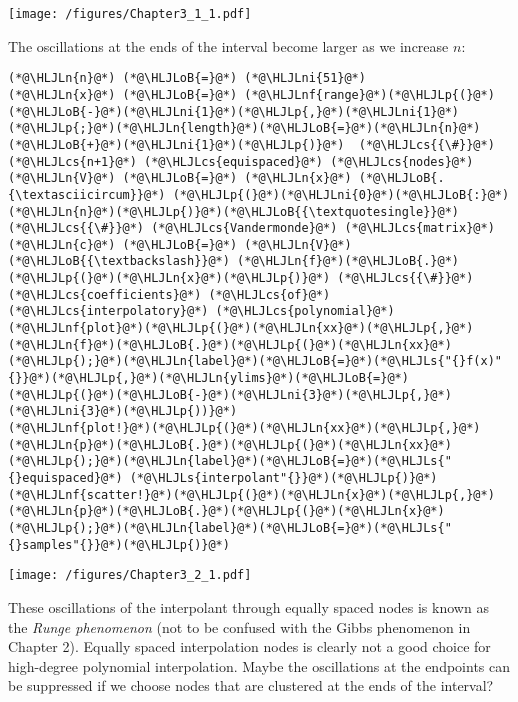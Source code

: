 \documentclass[12pt,a4paper]{article}
\newcommand{\HLJLn}[1]{#1}
\newcommand{\HLJLnf}[1]{\textcolor[RGB]{66,102,213}{#1}}
\newcommand{\HLJLs}[1]{\textcolor[RGB]{201,61,57}{#1}}
\newcommand{\HLJLni}[1]{\textcolor[RGB]{59,151,46}{#1}}
\newcommand{\HLJLoB}[1]{\textcolor[RGB]{102,102,102}{\textbf{#1}}}
\newcommand{\HLJLp}[1]{#1}
\newcommand{\HLJLcs}[1]{\textcolor[RGB]{153,153,119}{\textit{#1}}}
\begin{document}
\texttt{[image: /figures/Chapter3\_1\_1.pdf]}

The oscillations at the ends of the interval become larger as we increase $n$:


\begin{lstlisting}
(*@\HLJLn{n}@*) (*@\HLJLoB{=}@*) (*@\HLJLni{51}@*)
(*@\HLJLn{x}@*) (*@\HLJLoB{=}@*) (*@\HLJLnf{range}@*)(*@\HLJLp{(}@*)(*@\HLJLoB{-}@*)(*@\HLJLni{1}@*)(*@\HLJLp{,}@*)(*@\HLJLni{1}@*)(*@\HLJLp{;}@*)(*@\HLJLn{length}@*)(*@\HLJLoB{=}@*)(*@\HLJLn{n}@*)(*@\HLJLoB{+}@*)(*@\HLJLni{1}@*)(*@\HLJLp{)}@*)  (*@\HLJLcs{{\#}}@*) (*@\HLJLcs{n+1}@*) (*@\HLJLcs{equispaced}@*) (*@\HLJLcs{nodes}@*)  
(*@\HLJLn{V}@*) (*@\HLJLoB{=}@*) (*@\HLJLn{x}@*) (*@\HLJLoB{.{\textasciicircum}}@*) (*@\HLJLp{(}@*)(*@\HLJLni{0}@*)(*@\HLJLoB{:}@*)(*@\HLJLn{n}@*)(*@\HLJLp{)}@*)(*@\HLJLoB{{\textquotesingle}}@*) (*@\HLJLcs{{\#}}@*) (*@\HLJLcs{Vandermonde}@*) (*@\HLJLcs{matrix}@*)
(*@\HLJLn{c}@*) (*@\HLJLoB{=}@*) (*@\HLJLn{V}@*) (*@\HLJLoB{{\textbackslash}}@*) (*@\HLJLn{f}@*)(*@\HLJLoB{.}@*)(*@\HLJLp{(}@*)(*@\HLJLn{x}@*)(*@\HLJLp{)}@*) (*@\HLJLcs{{\#}}@*) (*@\HLJLcs{coefficients}@*) (*@\HLJLcs{of}@*) (*@\HLJLcs{interpolatory}@*) (*@\HLJLcs{polynomial}@*)
(*@\HLJLnf{plot}@*)(*@\HLJLp{(}@*)(*@\HLJLn{xx}@*)(*@\HLJLp{,}@*)(*@\HLJLn{f}@*)(*@\HLJLoB{.}@*)(*@\HLJLp{(}@*)(*@\HLJLn{xx}@*)(*@\HLJLp{);}@*)(*@\HLJLn{label}@*)(*@\HLJLoB{=}@*)(*@\HLJLs{"{}f(x)"{}}@*)(*@\HLJLp{,}@*)(*@\HLJLn{ylims}@*)(*@\HLJLoB{=}@*)(*@\HLJLp{(}@*)(*@\HLJLoB{-}@*)(*@\HLJLni{3}@*)(*@\HLJLp{,}@*)(*@\HLJLni{3}@*)(*@\HLJLp{))}@*)
(*@\HLJLnf{plot!}@*)(*@\HLJLp{(}@*)(*@\HLJLn{xx}@*)(*@\HLJLp{,}@*)(*@\HLJLn{p}@*)(*@\HLJLoB{.}@*)(*@\HLJLp{(}@*)(*@\HLJLn{xx}@*)(*@\HLJLp{);}@*)(*@\HLJLn{label}@*)(*@\HLJLoB{=}@*)(*@\HLJLs{"{}equispaced}@*) (*@\HLJLs{interpolant"{}}@*)(*@\HLJLp{)}@*)
(*@\HLJLnf{scatter!}@*)(*@\HLJLp{(}@*)(*@\HLJLn{x}@*)(*@\HLJLp{,}@*)(*@\HLJLn{p}@*)(*@\HLJLoB{.}@*)(*@\HLJLp{(}@*)(*@\HLJLn{x}@*)(*@\HLJLp{);}@*)(*@\HLJLn{label}@*)(*@\HLJLoB{=}@*)(*@\HLJLs{"{}samples"{}}@*)(*@\HLJLp{)}@*)
\end{lstlisting}

\texttt{[image: /figures/Chapter3\_2\_1.pdf]}

These oscillations of the interpolant through equally spaced nodes is known as the \emph{Runge phenomenon} (not to be confused with the Gibbs phenomenon in Chapter 2). Equally spaced interpolation nodes is clearly not a good choice for high-degree polynomial interpolation.  Maybe the oscillations at the endpoints can be suppressed if we choose nodes that are clustered at the ends of the interval?
\end{document}
